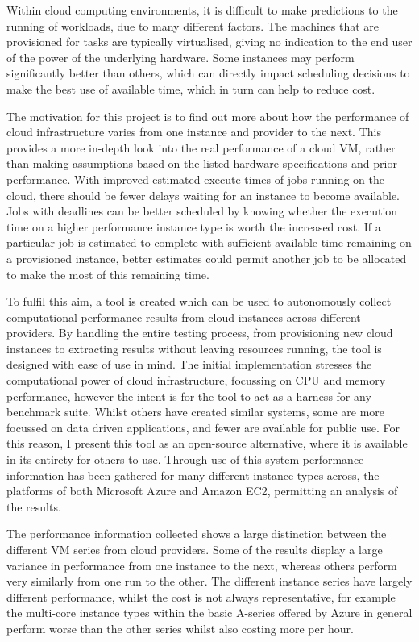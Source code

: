 \documentclass{llncs}
\begin{document}
Within cloud computing environments, it is difficult to make predictions to the running of workloads, due to many different factors. The machines that are provisioned for tasks are typically virtualised, giving no indication to the end user of the power of the underlying hardware. Some instances may perform significantly better than others, which can directly impact scheduling decisions to make the best use of available time, which in turn can help to reduce cost.

The motivation for this project is to find out more about how the performance of cloud infrastructure varies from one instance and provider to the next. This provides a more in-depth look into the real performance of a cloud VM, rather than making assumptions based on the listed hardware specifications and prior performance. With improved estimated execute times of jobs running on the cloud, there should be fewer delays waiting for an instance to become available. Jobs with deadlines can be better scheduled by knowing whether the execution time on a higher performance instance type is worth the increased cost. If a particular job is estimated to complete with sufficient available time remaining on a provisioned instance, better estimates could permit another job to be allocated to make the most of this remaining time.

To fulfil this aim, a tool is created which can be used to autonomously collect computational performance results from cloud instances across different providers. By handling the entire testing process, from provisioning new cloud instances to extracting results without leaving resources running, the tool is designed with ease of use in mind. The initial implementation stresses the computational power of cloud infrastructure, focussing on CPU and memory performance, however the intent is for the tool to act as a harness for any benchmark suite. Whilst others have created similar systems, some are more focussed on data driven applications, and fewer are available for public use. For this reason, I present this tool as an open-source alternative, where it is available in its entirety for others to use. Through use of this system performance information has been gathered for many different instance types across, the platforms of both Microsoft Azure and Amazon EC2, permitting an analysis of the results.

The performance information collected shows a large distinction between the different VM series from cloud providers. Some of the results display a large variance in performance from one instance to the next, whereas others perform very similarly from one run to the other. The different instance series have largely different performance, whilst the cost is not always representative, for example the multi-core instance types within the basic A-series offered by Azure in general perform worse than the other series whilst also costing more per hour.
\end{document}
